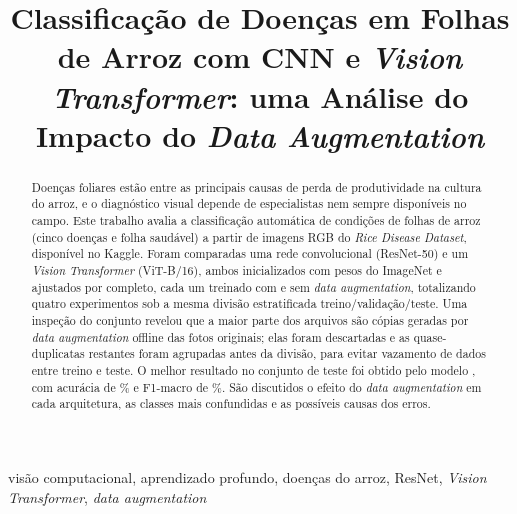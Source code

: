 \documentclass[conference]{IEEEtran}
\begin{document}
\title{Classificação de Doenças em Folhas de Arroz com CNN e \textit{Vision Transformer}:
uma Análise do Impacto do \textit{Data Augmentation}}

\author{
}

\maketitle

\begin{abstract}
Doenças foliares estão entre as principais causas de perda de produtividade na cultura do arroz, e o diagnóstico visual depende de especialistas nem sempre disponíveis no campo. Este trabalho avalia a classificação automática de \NClasses{} condições de folhas de arroz (cinco doenças e folha saudável) a partir de imagens RGB do \textit{Rice Disease Dataset}, disponível no Kaggle. Foram comparadas uma rede convolucional (ResNet-50) e um \textit{Vision Transformer} (ViT-B/16), ambos inicializados com pesos do ImageNet e ajustados por completo, cada um treinado com e sem \textit{data augmentation}, totalizando quatro experimentos sob a mesma divisão estratificada treino/validação/teste. Uma inspeção do conjunto revelou que a maior parte dos arquivos são cópias geradas por \textit{data augmentation} offline das fotos originais; elas foram descartadas e as quase-duplicatas restantes foram agrupadas antes da divisão, para evitar vazamento de dados entre treino e teste. O melhor resultado no conjunto de teste foi obtido pelo modelo \BestLabel{}, com acurácia de \BestAcc\% e F1-macro de \BestFOne\%. São discutidos o efeito do \textit{data augmentation} em cada arquitetura, as classes mais confundidas e as possíveis causas dos erros.
\end{abstract}

\begin{IEEEkeywords}
visão computacional, aprendizado profundo, doenças do arroz, ResNet, \textit{Vision Transformer}, \textit{data augmentation}
\end{IEEEkeywords}

\end{document}
